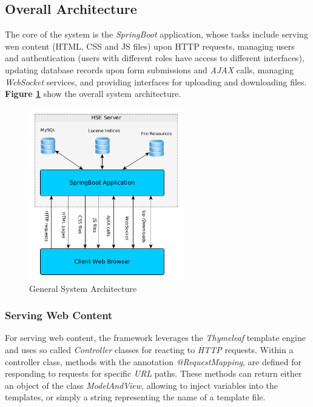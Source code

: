 \documentclass[a4paper]{usiinfbachelorproject}
\begin{document}
\subsection{\textbf{Overall Architecture}} \label{sec:archOverall}

The core of the system is the \emph{SpringBoot} application, whose tasks include serving wen content
(HTML, CSS and JS files) upon HTTP requests, managing users and authentication (users with different roles have access to different interfaces),
updating database records upon form submissions and \emph{AJAX} calls, managing \emph{WebSocket} services, and
providing interfaces for uploading and downloading files. \textbf{Figure \ref{fig:archGeneral}} show the
overall system architecture.

\begin{figure}[h!]
\centering
\includegraphics[width=0.6\textwidth]{figures/archGeneral}
\caption{General System Architecture}
\label{fig:archGeneral}
\end{figure}

\subsubsection{\textbf{Serving Web Content}}

For serving web content, the framework leverages the \emph{Thymeleaf} \cite{thymeleafHome} template engine and uses so called \emph{Controller}
classes for reacting to \emph{HTTP} requests. Within a controller class, methods with
the annotation \emph{@RequestMapping}, are defined for responding to requests for specific \emph{URL} paths.
These methods can return either an object of the class \emph{ModelAndView}, allowing to inject
variables into the templates, or simply a string representing the name of a template file. 
\end{document}
